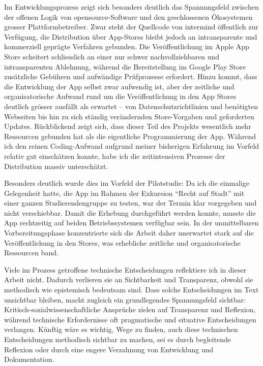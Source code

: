 \vspace{1em}

Im Entwicklungsprozess zeigt sich besonders deutlich das Spannungsfeld zwischen der offenen Logik von \gls{opensource}-Software und den geschlossenen Ökosystemen grosser Plattformbetreiber. Zwar steht der Quellcode von \gls{intermind} öffentlich zur Verfügung, die Distribution über App-Stores bleibt jedoch an intransparente und kommerziell geprägte Verfahren gebunden. Die Veröffentlichung im Apple App Store scheitert schliesslich an einer nur schwer nachvollziehbaren und intransparenten Ablehnung, während die Bereitstellung im Google Play Store zusätzliche Gebühren und aufwändige Prüfprozesse erfordert. Hinzu kommt, dass die Entwicklung der App selbst zwar aufwendig ist, aber der zeitliche und organisatorische Aufwand rund um die Veröffentlichung in den App Stores deutlich grösser ausfällt als erwartet -- von Datenschutzrichtlinien und benötigten Webseiten bis hin zu sich ständig verändernden Store-Vorgaben und geforderten Updates. Rückblickend zeigt sich, dass dieser Teil des Projekts wesentlich mehr Ressourcen gebunden hat als die eigentliche Programmierung der App. Während ich den reinen Coding-Aufwand aufgrund meiner bisherigen Erfahrung im Vorfeld relativ gut einschätzen konnte, habe ich die zeitintensiven Prozesse der Distribution massiv unterschätzt.

Besonders deutlich wurde dies im Vorfeld der Pilotstudie: Da ich die einmalige Gelegenheit hatte, die App im Rahmen der Exkursion \enquote{Recht auf Stadt} mit einer ganzen Studierendengruppe zu testen, war der Termin klar vorgegeben und nicht verschiebbar. Damit die Erhebung durchgeführt werden konnte, musste die App rechtzeitig auf beiden Betriebssystemen verfügbar sein. In der unmittelbaren Vorbereitungsphase konzentrierte sich die Arbeit daher unerwartet stark auf die Veröffentlichung in den Stores, was erhebliche zeitliche und organisatorische Ressourcen band. 

Viele im Prozess getroffene technische Entscheidungen reflektiere ich in dieser Arbeit nicht. Dadurch verlieren sie an Sichtbarkeit und Transparenz, obwohl sie methodisch wie epistemisch bedeutsam sind. Dass solche Entscheidungen im Text unsichtbar bleiben, macht zugleich ein grundlegendes Spannungsfeld sichtbar: Kritisch-sozialwissenschaftliche Ansprüche zielen auf Transparenz und Reflexion, während technische Erfordernisse oft pragmatische und situative Entscheidungen verlangen. Künftig wäre es wichtig, Wege zu finden, auch diese technischen Entscheidungen methodisch sichtbar zu machen, sei es durch begleitende Reflexion oder durch eine engere Verzahnung von Entwicklung und Dokumentation.

